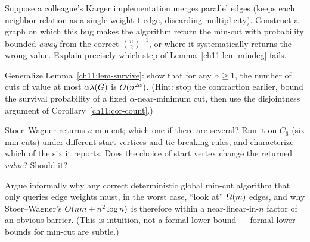 \begin{exercise}\label{ch11:ex-break}
Suppose a colleague's Karger implementation merges parallel edges (keeps each neighbor relation as a single weight-$1$ edge, discarding multiplicity). Construct a graph on which this bug makes the algorithm return the min-cut with probability bounded \emph{away} from the correct $\binom n2^{-1}$, or where it systematically returns the wrong value. Explain precisely which step of Lemma~\ref{ch11:lem-mindeg} fails.
\end{exercise}

\begin{exercise}\label{ch11:ex-near}
Generalize Lemma~\ref{ch11:lem-survive}: show that for any $\alpha\ge 1$, the number of cuts of value at most $\alpha\lambda(G)$ is $O(n^{2\alpha})$. (Hint: stop the contraction earlier, bound the survival probability of a fixed $\alpha$-near-minimum cut, then use the disjointness argument of Corollary~\ref{ch11:cor-count}.)
\end{exercise}

\begin{exercise}\label{ch11:ex-which}
Stoer--Wagner returns \emph{a} min-cut; which one if there are several? Run it on $C_6$ (six min-cuts) under different start vertices and tie-breaking rules, and characterize which of the six it reports. Does the choice of start vertex change the returned \emph{value}? Should it?
\end{exercise}

\begin{exercise}\label{ch11:ex-lower}
Argue informally why any correct deterministic global min-cut algorithm that only queries edge weights must, in the worst case, ``look at'' $\Omega(m)$ edges, and why Stoer--Wagner's $O(nm+n^2\log n)$ is therefore within a near-linear-in-$n$ factor of an obvious barrier. (This is intuition, not a formal lower bound --- formal lower bounds for min-cut are subtle.)
\end{exercise}
